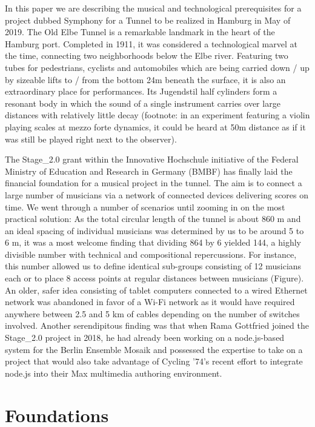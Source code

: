 In this paper we are describing the musical and technological prerequisites for a project dubbed Symphony for a Tunnel to be realized in Hamburg in May of 2019. The Old Elbe Tunnel is a remarkable landmark in the heart of the Hamburg port. Completed in 1911, it was considered a technological marvel at the time, connecting two neighborhoods below the Elbe river. Featuring two tubes for pedestrians, cyclists and automobiles which are being carried down / up by sizeable lifts to / from the bottom 24m beneath the surface, it is also an extraordinary place for performances. Its Jugendstil half cylinders form a resonant body in which the sound of a single instrument carries over large distances with relatively little decay (footnote: in an experiment featuring a violin playing scales at mezzo forte dynamics, it could be heard at 50m distance as if it was still be played right next to the observer).

The Stage\_2.0 grant within the Innovative Hochschule initiative of the Federal Ministry of Education and Research in Germany (BMBF) has finally laid the financial foundation for a musical project in the tunnel. The aim is to connect a large number of musicians via a network of connected devices delivering scores on time. We went through a number of scenarios until zooming in on the most practical solution: As the total circular length of the tunnel is about 860 m and an ideal spacing of individual musicians was determined by us to be around 5 to 6 m, it was a most welcome finding that dividing 864 by 6 yielded 144, a highly divisible number with technical and compositional repercussions. For instance, this number allowed us to define identical sub-groups consisting of 12 musicians each or to place 8 access points at regular distances between musicians (Figure). An older, safer idea consisting of tablet computers connected to a wired Ethernet network was abandoned in favor of a Wi-Fi network as it would have required anywhere between 2.5 and 5 km of cables depending on the number of switches involved. 
Another serendipitous finding was that when Rama Gottfried joined the Stage\_2.0 project in 2018, he had already been working on a node.js-based system for the Berlin Ensemble Mosaik and possessed the expertise to take on a project that would also take advantage of Cycling ’74’s recent effort to integrate node.js into their Max multimedia authoring environment.




\section{Foundations} \label{sec:foundations} 
%
%  
%
%


